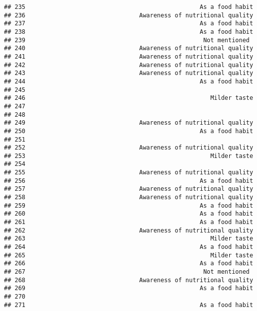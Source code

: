 \documentclass[
]{article}
\begin{document}
\begin{verbatim}
## 235                                                 As a food habit
## 236                                Awareness of nutritional quality
## 237                                                 As a food habit
## 238                                                 As a food habit
## 239                                                  Not mentioned 
## 240                                Awareness of nutritional quality
## 241                                Awareness of nutritional quality
## 242                                Awareness of nutritional quality
## 243                                Awareness of nutritional quality
## 244                                                 As a food habit
## 245                                                                
## 246                                                    Milder taste
## 247                                                                
## 248                                                                
## 249                                Awareness of nutritional quality
## 250                                                 As a food habit
## 251                                                                
## 252                                Awareness of nutritional quality
## 253                                                    Milder taste
## 254                                                                
## 255                                Awareness of nutritional quality
## 256                                                 As a food habit
## 257                                Awareness of nutritional quality
## 258                                Awareness of nutritional quality
## 259                                                 As a food habit
## 260                                                 As a food habit
## 261                                                 As a food habit
## 262                                Awareness of nutritional quality
## 263                                                    Milder taste
## 264                                                 As a food habit
## 265                                                    Milder taste
## 266                                                 As a food habit
## 267                                                  Not mentioned 
## 268                                Awareness of nutritional quality
## 269                                                 As a food habit
## 270                                                                
## 271                                                 As a food habit

\end{verbatim}
\end{document}
